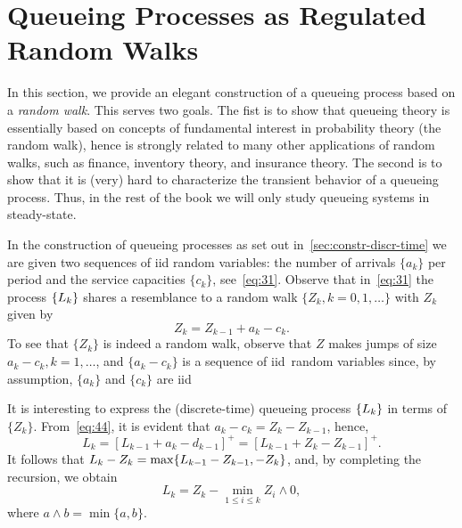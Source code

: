 

\section{Queueing Processes as Regulated Random Walks}
\label{sec:queu-proc-as}


In this section, we provide an elegant construction of a queueing process based on a \emph{random walk}.
This serves two goals.
The fist is to show that queueing theory is essentially based on concepts of fundamental interest in probability theory (the random walk), hence is strongly related to many other applications of random walks, such as finance, inventory theory, and insurance theory.
The second is to show that it is (very) hard to characterize the transient behavior of a queueing process.
Thus, in the rest of the book we will only study queueing systems in steady-state.







In the construction of queueing processes as set out in~\cref{sec:constr-discr-time} we are given two sequences of iid random variables: the number of arrivals $\{a_k\}$ per period and the service capacities $\{c_k\}$, see~\cref{eq:31}.
Observe that in~\cref{eq:31} the process $\{L_k\}$ shares a resemblance to a random walk $\{Z_k, k=0,1,\ldots\}$ with $Z_k$ given by
\begin{equation}\label{eq:44}
 Z_k = Z_{k-1} + a_k - c_k.
\end{equation}
To see that $\{Z_k\}$ is indeed a random walk, observe that $Z$ makes jumps of size $a_k-c_k, k=1,\ldots$, and $\{a_k-c_k\}$ is a sequence of iid\ random variables since, by assumption, $\{a_k\}$ and $\{c_k\}$ are iid


It is interesting to express the (discrete-time) queueing process $\{L_k\}$ in terms of $\{Z_k\}$. From~\cref{eq:44}, it is evident that $a_k - c_k = Z_k - Z_{k-1}$, hence,
\begin{equation*}
 L_k = [L_{k-1} +a_k- d_{k-1}]^+ = [L_{k-1} +Z_k- Z_{k-1}]^+.
\end{equation*}
It follows that  $L_k - Z_{k} = \max\{L_{k-1} - Z_{k-1}, -Z_k\}$,
and, by completing the recursion, we obtain
\begin{equation}\label{eq:reich1}
 L_k = Z_k - \min_{1\leq i \leq k} Z_i\wedge 0,
\end{equation}
where $a\wedge b = \min\{a,b\}$.



